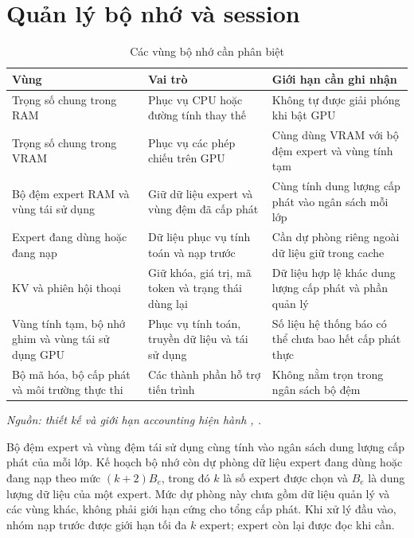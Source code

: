 \section{Quản lý bộ nhớ và session}

\begin{table}[htbp]
\centering
\setlength{\tabcolsep}{6pt}
\small
\caption{Các vùng bộ nhớ cần phân biệt}
\label{tab:bang_3_2}
\begin{tabularx}{\textwidth}{>{\RaggedRight\arraybackslash}p{4.0cm} >{\RaggedRight\arraybackslash}p{4.5cm} >{\RaggedRight\arraybackslash}X}
\toprule
\rowcolor{tableheader}
\textbf{Vùng} & \textbf{Vai trò} & \textbf{Giới hạn cần ghi nhận} \\
\midrule
Trọng số chung trong RAM & Phục vụ CPU hoặc đường tính thay thế & Không tự được giải phóng khi bật GPU \\
Trọng số chung trong VRAM & Phục vụ các phép chiếu trên GPU & Cùng dùng VRAM với bộ đệm expert và vùng tính tạm \\
Bộ đệm expert RAM và vùng tái sử dụng & Giữ dữ liệu expert và vùng đệm đã cấp phát & Cùng tính dung lượng cấp phát vào ngân sách mỗi lớp \\
Expert đang dùng hoặc đang nạp & Dữ liệu phục vụ tính toán và nạp trước & Cần dự phòng riêng ngoài dữ liệu giữ trong cache \\
KV và phiên hội thoại & Giữ khóa, giá trị, mã token và trạng thái dùng lại & Dữ liệu hợp lệ khác dung lượng cấp phát và phần quản lý \\
Vùng tính tạm, bộ nhớ ghim và vùng tái sử dụng GPU & Phục vụ tính toán, truyền dữ liệu và tái sử dụng & Số liệu hệ thống báo có thể chưa bao hết cấp phát thực \\
Bộ mã hóa, bộ cấp phát và môi trường thực thi & Các thành phần hỗ trợ tiến trình & Không nằm trọn trong ngân sách bộ đệm \\
\bottomrule
\end{tabularx}
\vspace{3pt}\par\noindent\footnotesize\textit{Nguồn: thiết kế và giới hạn accounting hiện hành \cite{moe_tierengine_arch}, \cite{exp_prefill_i5}.}
\end{table}

Bộ đệm expert và vùng đệm tái sử dụng cùng tính vào ngân sách dung lượng cấp phát của mỗi lớp. Kế hoạch bộ nhớ còn dự phòng dữ liệu expert đang dùng hoặc đang nạp theo mức $(k+2)B_e$, trong đó $k$ là số expert được chọn và $B_e$ là dung lượng dữ liệu của một expert. Mức dự phòng này chưa gồm dữ liệu quản lý và các vùng khác, không phải giới hạn cứng cho tổng cấp phát. Khi xử lý đầu vào, nhóm nạp trước được giới hạn tối đa $k$ expert; expert còn lại được đọc khi cần.

